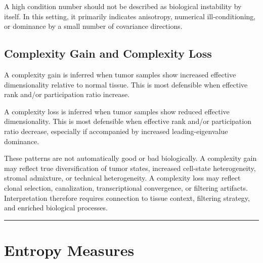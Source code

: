 \documentclass[
  letterpaper,
  DIV=11,
  numbers=noendperiod,
  openany,
  oneside]{scrreprt}
\begin{document}
\begin{tcolorbox}[enhanced jigsaw, opacityback=0, colframe=quarto-callout-warning-color-frame, toptitle=1mm, colback=white, breakable, toprule=.15mm, bottomrule=.15mm, opacitybacktitle=0.6, title=\textcolor{quarto-callout-warning-color}{\faExclamationTriangle}\hspace{0.5em}{Warning}, coltitle=black, rightrule=.15mm, leftrule=.75mm, left=2mm, bottomtitle=1mm, titlerule=0mm, colbacktitle=quarto-callout-warning-color!10!white, arc=.35mm]

A high condition number should not be described as biological
instability by itself. In this setting, it primarily indicates
anisotropy, numerical ill-conditioning, or dominance by a small number
of covariance directions.

\end{tcolorbox}

\subsection{Complexity Gain and Complexity
Loss}\label{complexity-gain-and-complexity-loss}

A complexity gain is inferred when tumor samples show increased
effective dimensionality relative to normal tissue. This is most
defensible when effective rank and/or participation ratio increase.

A complexity loss is inferred when tumor samples show reduced effective
dimensionality. This is most defensible when effective rank and/or
participation ratio decrease, especially if accompanied by increased
leading-eigenvalue dominance.

These patterns are not automatically good or bad biologically. A
complexity gain may reflect true diversification of tumor states,
increased cell-state heterogeneity, stromal admixture, or technical
heterogeneity. A complexity loss may reflect clonal selection,
canalization, transcriptional convergence, or filtering artifacts.
Interpretation therefore requires connection to tissue context,
filtering strategy, and enriched biological processes.

\begin{center}\rule{0.5\linewidth}{0.5pt}\end{center}

\section{Entropy Measures}\label{entropy-measures}
\end{document}
